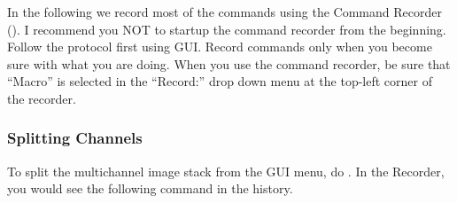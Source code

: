 In the following we record most of the commands using the Command Recorder (). I recommend you NOT to startup the command recorder from the beginning. Follow the protocol first using GUI. Record commands only when you become sure with what you are doing. When you use the command recorder, be sure that ``Macro'' is selected in the ``Record:'' drop down menu at the top-left corner of the recorder.

\subsubsection{Splitting Channels}

To split the multichannel image stack from the GUI menu, do . In the Recorder, you would see the following command in the history.